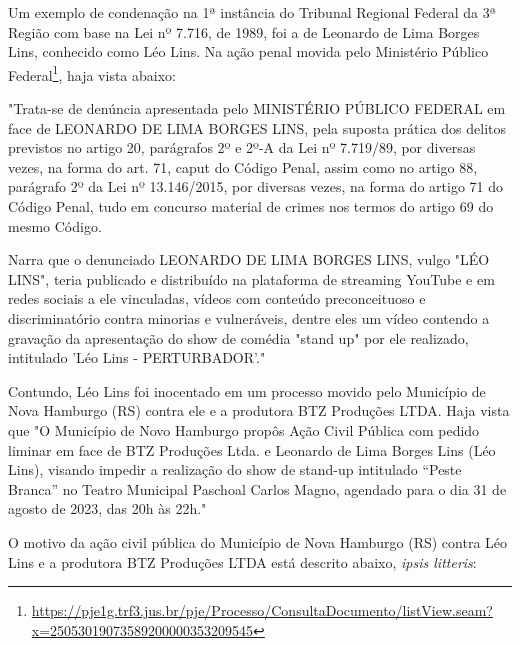 Um exemplo de condenação na 1ª instância do Tribunal Regional Federal da 3ª Região com base na Lei nº 7.716, de 1989, foi a de Leonardo de Lima Borges Lins, conhecido como Léo Lins. Na ação penal movida pelo Ministério Público Federal\footnote{\url{https://pje1g.trf3.jus.br/pje/Processo/ConsultaDocumento/listView.seam?x=25053019073589200000353209545}}, haja vista \cite{condenacao_leolins_trf3} abaixo:

\noindent
\begin{flushleft}
	\setlength{\leftskip}{4cm}
	\small
	"Trata-se de denúncia apresentada pelo MINISTÉRIO PÚBLICO FEDERAL em face de LEONARDO DE LIMA BORGES LINS, pela suposta prática dos delitos previstos no artigo 20, parágrafos 2º e 2º-A da Lei nº 7.719/89, por diversas vezes, na forma do art. 71, caput do Código Penal, assim como no artigo 88, parágrafo 2º da Lei nº 13.146/2015, por diversas vezes, na forma do artigo 71 do Código Penal, tudo em concurso material de crimes nos termos do artigo 69 do mesmo Código.
	
	Narra que o denunciado LEONARDO DE LIMA BORGES LINS, vulgo "LÉO LINS", teria publicado e distribuído na plataforma de streaming YouTube e em redes sociais a ele vinculadas, vídeos com conteúdo preconceituoso e discriminatório contra minorias e vulneráveis, dentre eles um vídeo contendo a gravação da apresentação do show de comédia "stand up" por ele realizado, intitulado 'Léo Lins - PERTURBADOR'." \cite{condenacao_leolins_trf3}
\end{flushleft}

Contundo, Léo Lins foi inocentado em um processo movido pelo Município de Nova Hamburgo (RS) contra ele e a produtora BTZ Produções LTDA. Haja vista \cite{liberdade_expressao_artistica_tjrs} que "O Município de Novo Hamburgo propôs Ação Civil Pública com pedido liminar em face de BTZ Produções Ltda. e Leonardo de Lima Borges Lins (Léo Lins), visando impedir a realização do show de stand-up intitulado “Peste Branca” no Teatro Municipal Paschoal Carlos Magno, agendado para o dia 31 de agosto de 2023, das 20h às 22h."

O motivo da ação civil pública do Município de Nova Hamburgo (RS) contra Léo Lins e a produtora BTZ Produções LTDA está descrito abaixo, \textit{ipsis litteris}:

